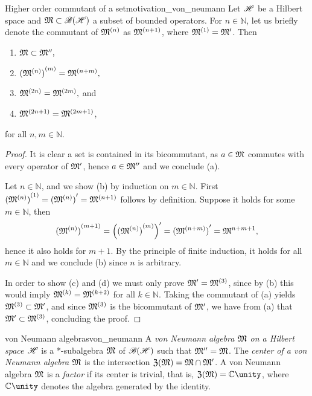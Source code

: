 \begin{proposition}{Higher order commutant of a set}{motivation_von_neumann}
    Let \(\mathscr{H}\) be a Hilbert space and \(\mathfrak{M} \subset \mathscr{B}(\mathscr{H})\) a subset of bounded operators. For \(n \in \mathbb{N}\), let us briefly denote the commutant of \(\mathfrak{M}^{(n)}\) as \(\mathfrak{M}^{(n+1)}\), where \(\mathfrak{M}^{(1)} = \mathfrak{M}'\). Then
    \begin{enumerate}[label=(\alph*)]
        \item \(\mathfrak{M} \subset \mathfrak{M}'',\)
        \item \({(\mathfrak{M}^{(n)})}^{(m)} = \mathfrak{M}^{(n+m)},\)
        \item \(\mathfrak{M}^{(2n)} = \mathfrak{M}^{(2m)},\) and
        \item \(\mathfrak{M}^{(2n+1)} = \mathfrak{M}^{(2m+1)}\),
    \end{enumerate}
    for all \(n, m \in \mathbb{N}\).
\end{proposition}
\begin{proof}
    It is clear a set is contained in its bicommutant, as \(a \in \mathfrak{M}\) commutes with every operator of \(\mathfrak{M}'\), hence \(a \in \mathfrak{M}''\) and we conclude (a).

    Let \(n \in \mathbb{N}\), and we show (b) by induction on \(m \in \mathbb{N}\). First \({(\mathfrak{M}^{(n)})}^{(1)} = {(\mathfrak{M}^{(n)})}' = \mathfrak{M}^{(n+1)}\) follows by definition. Suppose it holds for some \(m \in \mathbb{N}\), then
    \begin{equation*}
        {(\mathfrak{M}^{(n)})}^{(m+1)} = {\left({(\mathfrak{M}^{(n)})}^{(m)}\right)}' = {(\mathfrak{M}^{(n+m)})}' = \mathfrak{M}^{n+m+1},
    \end{equation*}
    hence it also holds for \(m + 1\). By the principle of finite induction, it holds for all \(m \in \mathbb{N}\) and we conclude (b) since \(n\) is arbitrary.

    In order to show (c) and (d) we must only prove \(\mathfrak{M}' = \mathfrak{M}^{(3)}\), since by (b) this would imply \(\mathfrak{M}^{(k)} = \mathfrak{M}^{(k + 2)}\) for all \(k \in \mathbb{N}\). Taking the commutant of (a) yields \(\mathfrak{M}^{(3)} \subset \mathfrak{M}'\), and since \(\mathfrak{M}^{(3)}\) is the bicommutant of \(\mathfrak{M}'\), we have from (a) that \(\mathfrak{M}' \subset \mathfrak{M}^{(3)}\), concluding the proof.
\end{proof}

\begin{definition}{von Neumann algebras}{von_neumann}
    A \emph{von Neumann algebra \(\mathfrak{M}\) on a Hilbert space \(\mathscr{H}\)} is a *-subalgebra \(\mathfrak{M}\) of \(\mathscr{B}(\mathscr{H})\) such that \(\mathfrak{M}'' = \mathfrak{M}\). The \emph{center of a von Neumann algebra \(\mathfrak{M}\)} is the intersection \(\mathfrak{Z}(\mathfrak{M}) = \mathfrak{M} \cap \mathfrak{M}'\). A von Neumann algebra \(\mathfrak{M}\) is a \emph{factor} if its center is trivial, that is, \(\mathfrak{Z}(\algebra{M}) = \mathbb{C} \unity\), where \(\mathbb{C} \unity\) denotes the algebra generated by the identity.
\end{definition}

